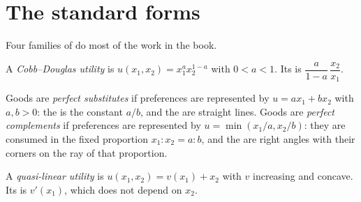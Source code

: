 \section{The standard forms}\label{sec:b1:preferences-and-utility:forms}

Four families of  do most of the work in the book.

\begin{definition}\label{def:b1:preferences-and-utility:cobb-douglas}
A \emph{Cobb--Douglas utility} is $u(x_1, x_2) = x_1^{a}x_2^{1-a}$ with
$0 < a < 1$. Its  is $\dfrac{a}{1 - a}\,\dfrac{x_2}{x_1}$.
\end{definition}

\begin{definition}\label{def:b1:preferences-and-utility:perfect}
Goods are \emph{perfect substitutes} if preferences are represented by
$u = a x_1 + b x_2$ with $a, b > 0$: the  is the constant $a/b$, and the
 are straight lines. Goods are \emph{perfect
complements} if preferences are represented by
$u = \min(x_1/a, x_2/b)$: they are consumed in the fixed proportion
$x_1 : x_2 = a : b$, and the  are right angles with their
corners on the ray of that proportion.
\end{definition}

\begin{definition}\label{def:b1:preferences-and-utility:quasi-linear}
A \emph{quasi-linear utility} is $u(x_1, x_2) = v(x_1) + x_2$ with $v$
increasing and concave. Its  is $v'(x_1)$, which does not depend on $x_2$.
\end{definition}

